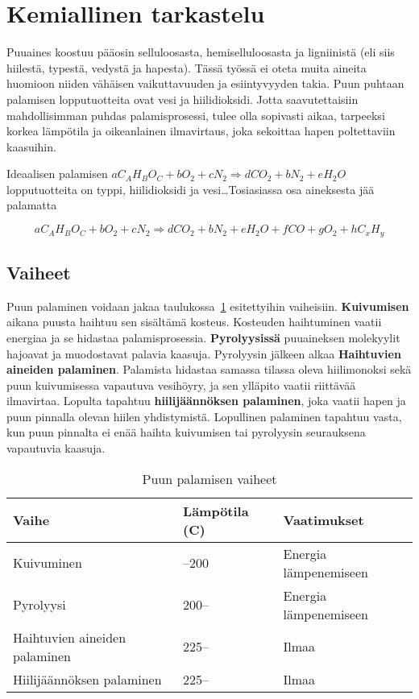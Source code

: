 \section{Kemiallinen tarkastelu}

Puuaines koostuu pääosin selluloosasta, hemiselluloosasta ja ligniinistä
(eli siis hiilestä, typestä, vedystä ja hapesta). Tässä työssä ei
oteta muita aineita huomioon niiden vähäisen vaikuttavuuden ja esiintyvyyden takia.
Puun puhtaan palamisen lopputuotteita ovat vesi ja hiilidioksidi.
Jotta saavutettaisiin mahdollisimman puhdas palamisprosessi, tulee olla sopivasti
aikaa, tarpeeksi korkea lämpötila ja oikeanlainen ilmavirtaus, joka sekoittaa hapen
poltettaviin kaasuihin.

Ideaalisen palamisen
\(a C_A H_B O_C + bO_2 + cN_2 \Rightarrow dCO_2 + bN_2 + eH_2O\) lopputuotteita on
typpi, hiilidioksidi ja vesi\ldots Tosiasiassa osa aineksesta jää palamatta

\begin{equation}
	a C_A H_B O_C + bO_2 + cN_2 \Rightarrow dCO_2 + bN_2 + eH_2O + fCO + gO_2 + hC_x H_y
\end{equation}

\subsection{Vaiheet}

Puun palaminen voidaan jakaa taulukossa~\ref{table:vaiheet} esitettyihin vaiheisiin.
\textbf{Kuivumisen} aikana puusta haihtuu sen sisältämä kosteus. Kosteuden haihtuminen
vaatii energiaa ja se hidastaa palamisprosessia. \textbf{Pyrolyysissä} puuaineksen
molekyylit hajoavat ja muodostavat palavia kaasuja. Pyrolyysin jälkeen alkaa
\textbf{Haihtuvien aineiden palaminen}. Palamista hidastaa samassa tilassa oleva
hiilimonoksi sekä puun kuivumisessa vapautuva vesihöyry, ja sen ylläpito vaatii
riittävää ilmavirtaa. Lopulta tapahtuu \textbf{hiilijäännöksen palaminen},
joka vaatii hapen ja puun pinnalla olevan hiilen yhdistymistä. Lopullinen palaminen
tapahtuu vasta, kun puun pinnalta ei enää haihta kuivumisen tai pyrolyysin seurauksena
vapautuvia kaasuja.

\begin{table}[H]
	\caption{Puun palamisen vaiheet}
	\label{table:vaiheet}
	\begin{tabular*}{\textwidth}{lll}
		\toprule
		\bf Vaihe & \bf Lämpötila (\textdegree C) & \bf Vaatimukset \\
		\midrule
		Kuivuminen & --200 & Energia lämpenemiseen \\
		Pyrolyysi & 200-- & Energia lämpenemiseen \\
		Haihtuvien aineiden palaminen & 225-- & Ilmaa \\
		Hiilijäännöksen palaminen & 225-- & Ilmaa \\
		\bottomrule
	\end{tabular*}
\end{table}

